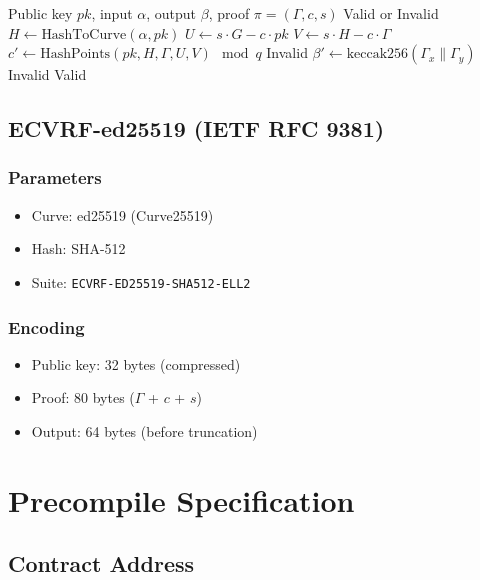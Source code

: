 \documentclass[11pt,a4paper]{article}
\theoremstyle{definition}
\begin{document}
\begin{algorithm}
\caption{ECVRF Verify}
\begin{algorithmic}[1]
\Require Public key $pk$, input $\alpha$, output $\beta$, proof $\pi = (\Gamma, c, s)$
\Ensure Valid or Invalid
\State $H \gets \text{HashToCurve}(\alpha, pk)$
\State $U \gets s \cdot G - c \cdot pk$
\State $V \gets s \cdot H - c \cdot \Gamma$
\State $c' \gets \text{HashPoints}(pk, H, \Gamma, U, V) \mod q$
    \Return Invalid
\EndIf
\State $\beta' \gets \text{keccak256}(\Gamma_x \| \Gamma_y)$
    \Return Invalid
\EndIf
\Return Valid
\end{algorithmic}
\end{algorithm}

\subsection{ECVRF-ed25519 (IETF RFC 9381)}

\subsubsection{Parameters}

\begin{itemize}
    \item Curve: ed25519 (Curve25519)
    \item Hash: SHA-512
    \item Suite: \texttt{ECVRF-ED25519-SHA512-ELL2}
\end{itemize}

\subsubsection{Encoding}

\begin{itemize}
    \item Public key: 32 bytes (compressed)
    \item Proof: 80 bytes ($\Gamma$ + $c$ + $s$)
    \item Output: 64 bytes (before truncation)
\end{itemize}

\section{Precompile Specification}

\subsection{Contract Address}
\end{document}
